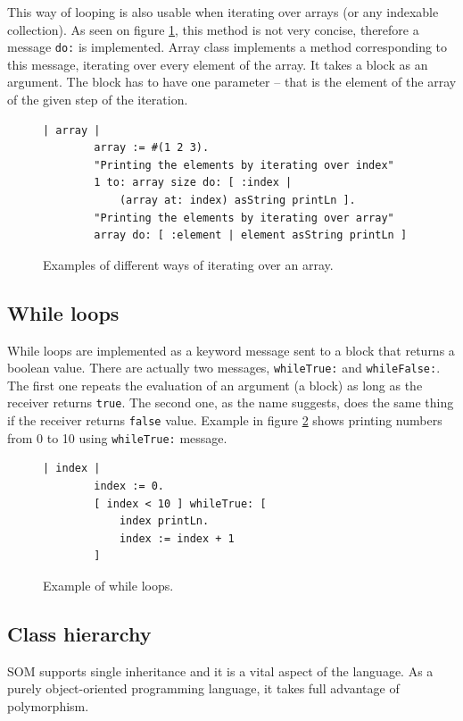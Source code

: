 \documentclass[thesis=M,english]{FITthesis}[2019/12/23]
\begin{document}
This way of looping is also usable when iterating over arrays (or any indexable collection). As seen on figure \ref{lst-for-array}, this method is not
very concise, therefore a message \texttt{do:} is implemented. Array class implements a method corresponding to this message, iterating
over every element of the array. It takes a block as an argument. The block has to have one parameter -- that is the element of the array
of the given step of the iteration.

\begin{figure}[h!]
	\begin{lstlisting}[language=Smalltalk]
		| array |
		array := #(1 2 3).
		"Printing the elements by iterating over index"
		1 to: array size do: [ :index |
			(array at: index) asString printLn ].
		"Printing the elements by iterating over array"
		array do: [ :element | element asString printLn ]
	\end{lstlisting}
	\caption{Examples of different ways of iterating over an array.}
	\label{lst-for-array}
\end{figure}

\subsection{While loops}
While loops are implemented as a keyword message sent to a block that returns a boolean value. There are actually
two messages, \texttt{whileTrue:} and \texttt{whileFalse:}. The first one repeats the evaluation of an argument (a block)
as long as the receiver returns \texttt{true}. The second one, as the name suggests, does the same thing if the receiver returns
\texttt{false} value. Example in figure \ref{lst-while} shows printing numbers from 0 to 10 using \texttt{whileTrue:}
message.

\begin{figure}[h!]
	\begin{lstlisting}[language=Smalltalk]
		| index |
		index := 0.
		[ index < 10 ] whileTrue: [
			index printLn.
			index := index + 1
		]
	\end{lstlisting}
	\caption{Example of while loops.}
	\label{lst-while}
\end{figure}

\subsection{Class hierarchy}
SOM supports single inheritance and it is a vital aspect of the language. As a purely object-oriented programming language,
it takes full advantage of polymorphism.
\end{document}

